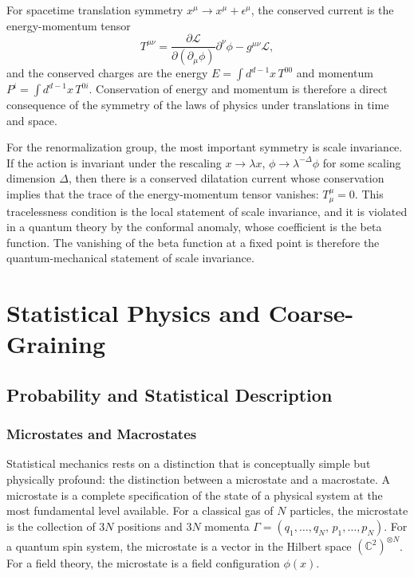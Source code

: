 \documentclass[11pt, twoside, openright]{book}
\theoremstyle{dotted}
\theoremstyle{definition}
\begin{document}
For spacetime translation symmetry $x^\mu \to x^\mu + \epsilon^\mu$, the conserved
current is the energy-momentum tensor
\begin{equation}
  T^{\mu\nu} = \frac{\partial \mathcal{L}}{\partial(\partial_\mu\phi)}
  \partial^\nu \phi - g^{\mu\nu}\mathcal{L},
  \label{eq:emt}
\end{equation}
and the conserved charges are the energy $E = \int d^{d-1}x \, T^{00}$ and
momentum $P^i = \int d^{d-1}x \, T^{0i}$. Conservation of energy and momentum
is therefore a direct consequence of the symmetry of the laws of physics under
translations in time and space.

For the renormalization group, the most important symmetry is scale invariance.
If the action is invariant under the rescaling $x \to \lambda x$, $\phi \to
\lambda^{-\Delta}\phi$ for some scaling dimension $\Delta$, then there is a
conserved dilatation current whose conservation implies that the trace of the
energy-momentum tensor vanishes: $T^\mu_\mu = 0$. This tracelessness condition
is the local statement of scale invariance, and it is violated in a quantum theory
by the conformal anomaly, whose coefficient is the beta function. The vanishing
of the beta function at a fixed point is therefore the quantum-mechanical
statement of scale invariance.

\part{Statistical Physics and Coarse-Graining}

\chapter{Probability and Statistical Description}
\label{ch:stat_phys}

\section{Microstates and Macrostates}

Statistical mechanics rests on a distinction that is conceptually simple but
physically profound: the distinction between a microstate and a macrostate. A
microstate is a complete specification of the state of a physical system at the
most fundamental level available. For a classical gas of $N$ particles, the
microstate is the collection of $3N$ positions and $3N$ momenta
$\Gamma = (q_1, \ldots, q_N,\allowbreak\, p_1, \ldots, p_N)$. For a quantum spin system,
the microstate is a vector in the Hilbert space $(\mathbb{C}^2)^{\otimes N}$.
For a field theory, the microstate is a field configuration $\phi(x)$.
\end{document}
